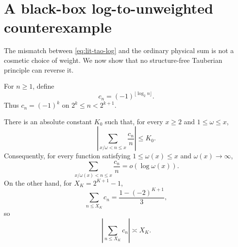 \section{A black-box log-to-unweighted counterexample}
\label{sec:log-counterexample}

The mismatch between \eqref{eq:lit-tao-log} and the ordinary physical
sum is not a cosmetic choice of weight.  We now show that no
structure-free Tauberian principle can reverse it.

\begin{definition}
\label{def:dyadic-sequence}
For \(n\ge1\), define
\begin{equation}
 c_n=(-1)^{\lfloor\log_2n\rfloor}.
 \label{eq:dyadic-sequence}
\end{equation}
Thus \(c_n=(-1)^k\) on
\(2^k\le n<2^{k+1}\).
\end{definition}

\begin{theorem}
\label{thm:log-counterexample}
There is an absolute constant \(K_0\) such that, for every \(x\ge2\)
and \(1\le\omega\le x\),
\begin{equation}
 \left|
 \sum_{x/\omega<n\le x}\frac{c_n}{n}
 \right|\le K_0.
 \label{eq:dyadic-uniform-log-bound}
\end{equation}
Consequently, for every function satisfying
\(1\le\omega(x)\le x\) and \(\omega(x)\to\infty\),
\begin{equation}
 \sum_{x/\omega(x)<n\le x}\frac{c_n}{n}
 =o(\log\omega(x)).
 \label{eq:dyadic-log-cancellation}
\end{equation}
On the other hand, for
\(X_K=2^{K+1}-1\),
\begin{equation}
 \sum_{n\le X_K}c_n
 =\frac{1-(-2)^{K+1}}3,
 \label{eq:dyadic-large-partial-sum}
\end{equation}
so
\begin{equation}
 \left|\sum_{n\le X_K}c_n\right|
 \asymp X_K.
 \label{eq:dyadic-no-ordinary-cancellation}
\end{equation}
\end{theorem}

